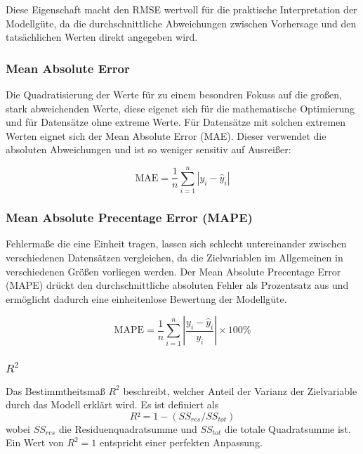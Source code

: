 Diese Eigenschaft macht den RMSE wertvoll für die praktische Interpretation der Modellgüte, da die durchschnittliche Abweichungen zwischen Vorhersage und den tatsächlichen Werten direkt angegeben wird. 

\subsubsection{Mean Absolute Error}
Die Quadratisierung der Werte für zu einem besondren Fokuss auf die großen, stark abweichenden Werte, diese eigenet sich für die mathematische Optimierung und für Datensätze ohne extreme Werte. Für Datensätze mit solchen extremen Werten eignet sich der Mean Absolute Error (MAE). Dieser verwendet die absoluten Abweichungen und ist so weniger sensitiv auf Ausreißer:

\begin{equation}
  \text{MAE} = \frac{1}{n} \sum_{i=1}^{n} |y_i - \hat{y}_i|
  \label{eq:mae}
\end{equation}

\subsubsection{Mean Absolute Precentage Error (MAPE)}

Fehlermaße die eine Einheit tragen, lassen sich schlecht untereinander zwischen verschiedenen Datensätzen vergleichen, da die Zielvariablen im Allgemeinen in verschiedenen Größen vorliegen werden. Der Mean Absolute Precentage Error (MAPE) drückt den durchschnittliche absoluten Fehler als Prozentsatz aus und ermöglicht dadurch eine einheitenlose Bewertung der Modellgüte.

\begin{equation}
\text{MAPE} = \frac{1}{n} \sum_{i=1}^{n} \left|\frac{y_i - \hat{y}_i}{y_i}\right| \times 100\%
\label{eq:mape}
\end{equation}

\subsubsection{\(R^2\)}
Das Bestimmtheitsmaß \(R^2\) beschreibt, welcher Anteil der Varianz der Zielvariable durch das Modell erklärt wird. Es ist definiert als
\begin{equation}
  R² = 1 - (SS_{res} / SS_{tot})
\end{equation}
wobei \(SS_{res}\) die Residuenquadratsumme und \(SS_{tot}\) die totale Quadratsumme ist. Ein Wert von \(R^2 = 1\) entspricht einer perfekten Anpassung.

